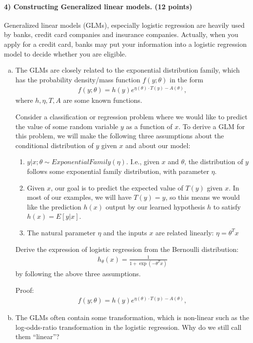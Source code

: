 \documentclass[11pt]{article}
\begin{document}
\paragraph{4) Constructing Generalized linear models. (12 points)}
Generalized linear models (GLMs), especially logistic regression are heavily used by banks, credit card companies and insurance companies. Actually, when you apply for a credit card, banks may put your information into a logistic regression model to decide whether you are eligible.
\begin{enumerate}[(a)]
\item The GLMs are closely related to the exponential distribution family, which has the probability density/mass function $f(y; \theta)$ in the form
\begin{align}
f(y; \theta) = h(y)e^{\eta(\theta)\cdot T(y)-A(\theta)},
\end{align}
where $h,\eta,T,A$ are some known functions.

Consider a classification or regression problem where we would like to predict the value of some random variable $y$ as a function of
$x$. To derive a GLM for this problem, we will make the following three assumptions about the conditional distribution of $y$ given $x$ and about our model:
\begin{enumerate}[1.]
\item
$y | x; \theta \sim ExponentialFamily(\eta)$. I.e., given $x$ and $\theta$, the distribution of $y$ follows some exponential family distribution, with parameter $\eta$.
\item
Given $x$, our goal is to predict the expected value of $T(y)$ given $x$. In most of our examples, we will have $T(y) = y$, so this means we
would like the prediction $h(x)$ output by our learned hypothesis $h$ to satisfy $h(x) = E[y|x]$.
\item
The natural parameter $\eta$ and the inputs $x$ are related linearly: $\eta = \theta^T x$
\end{enumerate}
Derive the expression of logistic regression from the Bernoulli distribution:
\begin{align}
h_{\theta}(x)=\frac{1}{1+\exp(-\theta^Tx)}
\end{align}
by following the above three assumptions.

Proof:
\begin{align}
f(y; \theta) = h(y)e^{\eta(\theta)\cdot T(y)-A(\theta)},
\end{align}

\item
The GLMs often contain some transformation, which is non-linear such as the log-odds-ratio transformation in the logistic regression. Why do we still call them ``linear''?
\end{enumerate}
\end{document}
